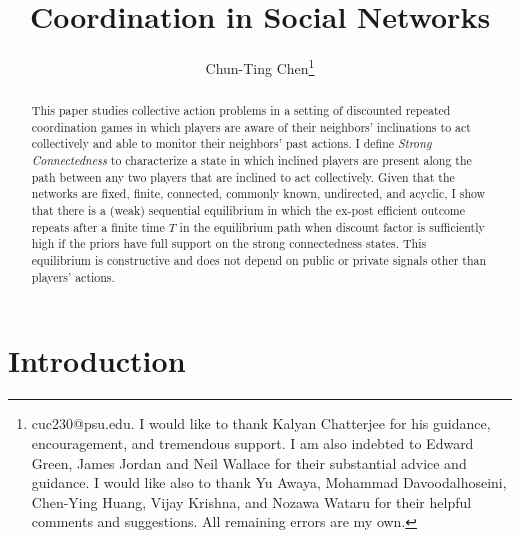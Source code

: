 \documentclass[12pt,letterpaper]{article}
\theoremstyle{definition}
\theoremstyle{remark}
\theoremstyle{claim}
\begin{document}



\title {Coordination in Social Networks}


\author {Chun-Ting Chen\thanks{cuc230@psu.edu. I would like to thank Kalyan Chatterjee for his guidance, encouragement, and tremendous support. I am also indebted to Edward Green, James Jordan and Neil Wallace for their substantial advice and guidance. I would like also to thank Yu Awaya, Mohammad Davoodalhoseini, Chen-Ying Huang, Vijay Krishna, and Nozawa Wataru for their helpful comments and suggestions. All remaining errors are my own.}}




\maketitle








\begin{abstract}

This paper studies collective action problems in a setting of discounted repeated coordination games in which players are aware of their neighbors' inclinations to act collectively and able to monitor their neighbors' past actions. I define \textit{Strong Connectedness} to characterize a state in which inclined players are present along the path between any two players that are inclined to act collectively. Given that the networks are fixed, finite, connected, commonly known, undirected, and acyclic, I show that there is a (weak) sequential equilibrium in which the ex-post efficient outcome repeats after a finite time $T$ in the equilibrium path when discount factor is sufficiently high if the priors have full support on the strong connectedness states. This equilibrium is constructive and does not depend on public or private signals other than players' actions.



\end{abstract}








\section{Introduction} 
\end{document}
